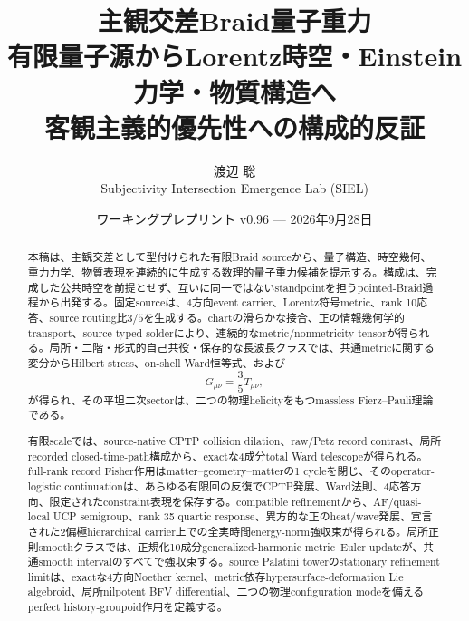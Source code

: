 \documentclass[11pt]{article}
\title{\vspace{-1.2cm}\textbf{主観交差Braid量子重力}\\[0.35em]
\Large 有限量子源からLorentz時空・Einstein力学・物質構造へ\\[0.15em]
\large 客観主義的優先性への構成的反証}
\author{渡辺 聡\\\small Subjectivity Intersection Emergence Lab (SIEL)}
\date{ワーキングプレプリント v0.96 --- 2026年9月28日}
\theoremstyle{definition}
\theoremstyle{remark}
\begin{document}
\maketitle

\begin{center}
\end{center}

\begin{abstract}
本稿は、主観交差として型付けられた有限Braid sourceから、量子構造、時空幾何、重力力学、物質表現を連続的に生成する数理的量子重力候補を提示する。構成は、完成した公共時空を前提とせず、互いに同一ではないstandpointを担うpointed-Braid過程から出発する。固定sourceは、4方向event carrier、Lorentz符号metric、rank 10応答、source routing比$3/5$を生成する。chartの滑らかな接合、正の情報幾何学的transport、source-typed solderにより、連続的なmetric/nonmetricity tensorが得られる。局所・二階・形式的自己共役・保存的な長波長クラスでは、共通metricに関する変分からHilbert stress、on-shell Ward恒等式、および
\[
G_{\mu\nu}=\frac35T_{\mu\nu},
\]
が得られ、その平坦二次sectorは、二つの物理helicityをもつmassless Fierz--Pauli理論である。

有限scaleでは、source-native CPTP collision dilation、raw/Petz record contrast、局所recorded closed-time-path構成から、exactな4成分total Ward telescopeが得られる。full-rank record Fisher作用はmatter--geometry--matterの1 cycleを閉じ、そのoperator-logistic continuationは、あらゆる有限回の反復でCPTP発展、Ward法則、4応答方向、限定されたconstraint表現を保存する。compatible refinementから、AF/quasi-local UCP semigroup、rank 35 quartic response、異方的な正のheat/wave発展、宣言された2偏極hierarchical carrier上での全実時間energy-norm強収束が得られる。局所正則smoothクラスでは、正規化10成分generalized-harmonic metric--Euler updateが、共通smooth intervalのすべてで強収束する。source Palatini towerのstationary refinement limitは、exactな4方向Noether kernel、metric依存hypersurface-deformation Lie algebroid、局所nilpotent BFV differential、二つの物理configuration modeを備えるperfect history-groupoid作用を定義する。


\end{abstract}
\end{document}
